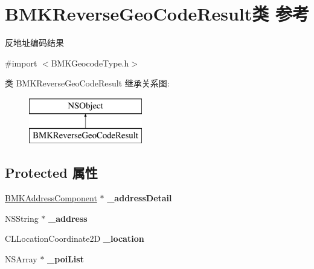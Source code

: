 \hypertarget{interface_b_m_k_reverse_geo_code_result}{}\section{B\+M\+K\+Reverse\+Geo\+Code\+Result类 参考}
\label{interface_b_m_k_reverse_geo_code_result}


反地址编码结果  




{\ttfamily \#import $<$B\+M\+K\+Geocode\+Type.\+h$>$}

类 B\+M\+K\+Reverse\+Geo\+Code\+Result 继承关系图\+:\begin{figure}[H]
\begin{center}
\leavevmode
\includegraphics[height=2.000000cm]{interface_b_m_k_reverse_geo_code_result}
\end{center}
\end{figure}
\subsection*{Protected 属性}
\begin{DoxyCompactItemize}
\item 
\hypertarget{interface_b_m_k_reverse_geo_code_result_a608c763c37e9f692c21284f6983666ee}{}\hyperlink{interface_b_m_k_address_component}{B\+M\+K\+Address\+Component} $\ast$ {\bfseries \+\_\+address\+Detail}\label{interface_b_m_k_reverse_geo_code_result_a608c763c37e9f692c21284f6983666ee}

\item 
\hypertarget{interface_b_m_k_reverse_geo_code_result_aaf0a6e9ae4f26fad365f95228cd019ad}{}N\+S\+String $\ast$ {\bfseries \+\_\+address}\label{interface_b_m_k_reverse_geo_code_result_aaf0a6e9ae4f26fad365f95228cd019ad}

\item 
\hypertarget{interface_b_m_k_reverse_geo_code_result_a879089700a14cf97e5f408dbeb453b82}{}C\+L\+Location\+Coordinate2\+D {\bfseries \+\_\+location}\label{interface_b_m_k_reverse_geo_code_result_a879089700a14cf97e5f408dbeb453b82}

\item 
\hypertarget{interface_b_m_k_reverse_geo_code_result_acc26e3e65250883c34ad4a7f71225441}{}N\+S\+Array $\ast$ {\bfseries \+\_\+poi\+List}\label{interface_b_m_k_reverse_geo_code_result_acc26e3e65250883c34ad4a7f71225441}

\end{DoxyCompactItemize}
